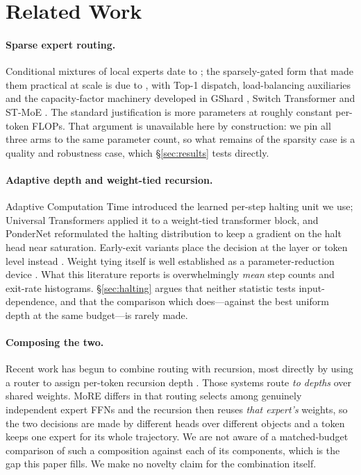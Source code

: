 \section{Related Work}
\label{sec:related}

\paragraph{Sparse expert routing.}
Conditional mixtures of local experts date to \citet{jacobs1991moe}; the
sparsely-gated form that made them practical at scale is due to
\citet{shazeer2017moe}, with Top-1 dispatch, load-balancing auxiliaries and the
capacity-factor machinery developed in GShard \citep{lepikhin2021gshard}, Switch
Transformer \citep{fedus2022switch} and ST-MoE \citep{zoph2022stmoe}. The standard
justification is more parameters at roughly constant per-token FLOPs. That
argument is unavailable here by construction: we pin all three arms to the same
parameter count, so what remains of the sparsity case is a quality and robustness
case, which \S\ref{sec:results} tests directly.

\paragraph{Adaptive depth and weight-tied recursion.}
Adaptive Computation Time \citep{graves2016act} introduced the learned per-step
halting unit we use; Universal Transformers \citep{dehghani2019ut} applied it to
a weight-tied transformer block, and PonderNet \citep{banino2021pondernet}
reformulated the halting distribution to keep a gradient on the halt head near
saturation. Early-exit variants place the decision at the layer or token level
instead \citep{elbayad2020depthadaptive,schuster2022calm,raposo2024mod}. Weight
tying itself is well established as a parameter-reduction device
\citep{lan2020albert}. What this literature reports is overwhelmingly
\emph{mean} step counts and exit-rate histograms. \S\ref{sec:halting} argues that
neither statistic tests input-dependence, and that the comparison which does---against
the best uniform depth at the same budget---is rarely made.

\paragraph{Composing the two.}
Recent work has begun to combine routing with recursion, most directly by using a
router to assign per-token recursion depth \citep{bae2025mor,raposo2024mod}.
Those systems route \emph{to depths} over shared weights. MoRE differs in that
routing selects among genuinely independent expert FFNs and the recursion then
reuses \emph{that expert's} weights, so the two decisions are made by different
heads over different objects and a token keeps one expert for its whole
trajectory. We are not aware of a matched-budget comparison of such a composition
against each of its components, which is the gap this paper fills. We make no
novelty claim for the combination itself.

